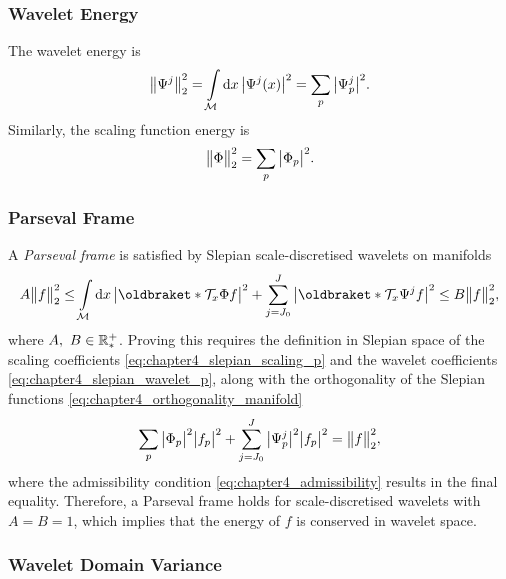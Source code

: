 \subsubsection{Wavelet Energy}

The wavelet energy is
%
\begin{equation}
	{\big\lVert\Psi^{j}\big\rVert}_{2}^{2}
	= \int\limits_{\mathcal{M}} \dd{x} \big\lvert\Psi^{j}(x)\big\rvert^{2}
	= \sum\limits_{p} \big\lvert{\Psi}_{p}^{j}\big\rvert^{2}.
\end{equation}
%
Similarly, the scaling function energy is
%
\begin{equation}
	{\big\lVert\Phi\big\rVert}_{2}^{2}
	= \sum\limits_{p} \big\lvert{\Phi}_{p}\big\rvert^{2}.
\end{equation}

\subsubsection{Parseval Frame}

A \emph{Parseval frame} is satisfied by Slepian scale-discretised wavelets on manifolds
%
\begin{equation}
	A\norm{f}^{2} \leq \integrateManifold{x}
	\abs{\braket{\translation{x}\Phi}{f}}^{2}
	+ \waveletSum \abs{\braket{\translation{x}\Psi^{j}}{f}}^{2}
	\leq B\norm{f}^{2},
\end{equation}
%
where \(A,\ B \in \mathbb{R}_{\ast}^{+}{}\).
Proving this requires the definition in Slepian space of the scaling coefficients \cref{eq:chapter4_slepian_scaling_p} and the wavelet coefficients \cref{eq:chapter4_slepian_wavelet_p}, along with the orthogonality of the Slepian functions \cref{eq:chapter4_orthogonality_manifold}
%
\begin{equation}
	\sum\limits_{p} \big\lvert{\Phi}_{p}\big\rvert^{2} \big\lvert{f}_{p}\big\rvert^{2}
	+ \sum\limits_{j=J_{0}}^{J} \big\lvert{\Psi}_{p}^{j}\big\rvert^{2} \big\lvert{f}_{p}\big\rvert^{2}
	= {\big\lVert f\big\rVert}_{2}^{2},
\end{equation}
%
where the admissibility condition \cref{eq:chapter4_admissibility} results in the final equality.
Therefore, a Parseval frame holds for scale-discretised wavelets with \(A = B = 1\), which implies that the energy of \(f\) is conserved in wavelet space.

\subsubsection{Wavelet Domain Variance}

